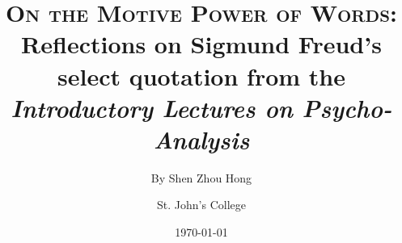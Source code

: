\documentclass[
  12pt,       %
  letter,    %
  final,      %
  onecolumn,  %
  oneside,    %
  notitlepage %
]{article}
\title{
  \textbf{\textsc{On the Motive Power of Words}}: \\ Reflections on Sigmund Freud's select quotation from the \emph{Introductory Lectures on Psycho-Analysis}
}
\author{
  By Shen Zhou Hong \and St. John's College
}
\date{\today}
\begin{document}
\maketitle

% 


\nocite{*}

%
\end{document}
